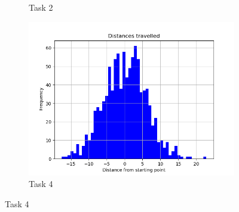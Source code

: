 \documentclass{article}
\begin{document}
\begin{figure}
\begin{subfigure}[b]{0.5\textwidth}
                    \caption{Task 2}
            \end{subfigure}
            \begin{subfigure}[b]{0.5\textwidth}
                \centering
                \includegraphics[width=\textwidth]{Graphs/task4.png}
                \caption{Task 4}
            \end{subfigure}
    \end{figure}
\end{document}
